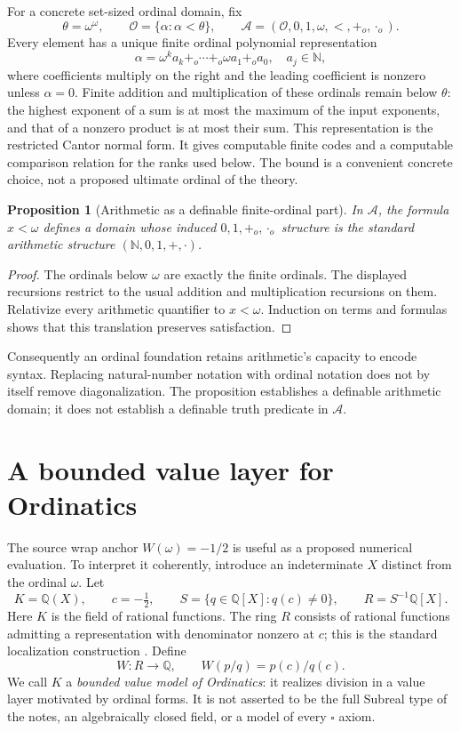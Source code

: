 \documentclass[11pt]{article}
\newtheorem{proposition}[theorem]{Proposition}
\theoremstyle{definition}
\newcommand{\N}{\mathbb N}
\newcommand{\Q}{\mathbb Q}
\newcommand{\Ord}{\mathcal O}
\begin{document}
For a concrete set-sized ordinal domain, fix
\[
\theta=\omega^\omega,\qquad \Ord=\{\alpha : \alpha<\theta\},
\qquad \mathcal A=(\Ord,0,1,\omega,<,+_o,\cdot_o).
\]
Every element has a unique finite ordinal polynomial representation
\[
\alpha=\omega^k a_k+_o\cdots+_o\omega a_1+_o a_0,
\quad a_j\in\N,
\]
where coefficients multiply on the right and the leading coefficient is nonzero unless $\alpha=0$. Finite addition and multiplication of these ordinals remain below $\theta$: the highest exponent of a sum is at most the maximum of the input exponents, and that of a nonzero product is at most their sum. This representation is the restricted Cantor normal form. It gives computable finite codes and a computable comparison relation for the ranks used below. The bound is a convenient concrete choice, not a proposed ultimate ordinal of the theory.

\begin{proposition}[Arithmetic as a definable finite-ordinal part]
In $\mathcal A$, the formula $x<\omega$ defines a domain whose induced $0,1,+_o,\cdot_o$ structure is the standard arithmetic structure $(\N,0,1,+,\cdot)$.
\end{proposition}
\begin{proof}
The ordinals below $\omega$ are exactly the finite ordinals. The displayed recursions restrict to the usual addition and multiplication recursions on them. Relativize every arithmetic quantifier to $x<\omega$. Induction on terms and formulas shows that this translation preserves satisfaction.
\end{proof}

Consequently an ordinal foundation retains arithmetic's capacity to encode syntax. Replacing natural-number notation with ordinal notation does not by itself remove diagonalization. The proposition establishes a definable arithmetic domain; it does not establish a definable truth predicate in $\mathcal A$.

\section{A bounded value layer for Ordinatics}
The source wrap anchor $W(\omega)=-1/2$ is useful as a proposed numerical evaluation. To interpret it coherently, introduce an indeterminate $X$ distinct from the ordinal $\omega$. Let
\[
K=\Q(X),\qquad c=-\tfrac12,
\qquad S=\{q\in\Q[X]:q(c)\ne0\},\qquad R=S^{-1}\Q[X].
\]
Here $K$ is the field of rational functions. The ring $R$ consists of rational functions admitting a representation with denominator nonzero at $c$; this is the standard localization construction \cite{stacks}. Define
\[
W:R\longrightarrow\Q,\qquad W(p/q)=p(c)/q(c).
\]
We call $K$ a \emph{bounded value model of Ordinatics}: it realizes division in a value layer motivated by ordinal forms. It is not asserted to be the full Subreal type of the notes, an algebraically closed field, or a model of every $\square$ axiom.
\end{document}
